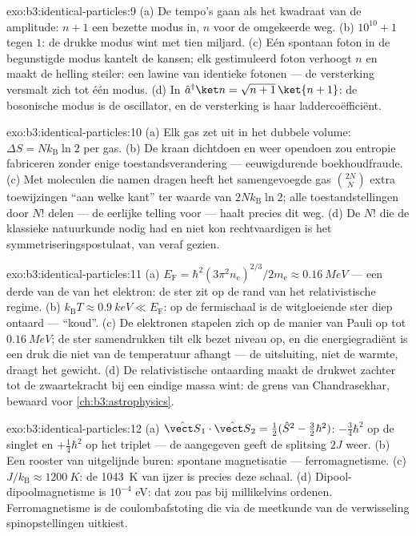 \begin{solution}{exo:b3:identical-particles:9}
(a) De tempo's gaan als het kwadraat van de amplitude: $n + 1$ een bezette
modus in, $n$ voor de omgekeerde weg. (b) $10^{10} + 1$ tegen $1$: de
drukke modus wint met tien miljard. (c) Eén spontaan foton in de
begunstigde modus kantelt de kansen; elk gestimuleerd foton verhoogt $n$
en maakt de helling steiler: een lawine van identieke fotonen --- de
versterking versmalt zich tot één modus. (d) In $\hat a^\dagger\ket n =
\sqrt{n+1}\,\ket{n+1}$: de bosonische modus is de oscillator, en de
versterking is haar laddercoëfficiënt.
\end{solution}

\begin{solution}{exo:b3:identical-particles:10}
(a) Elk gas zet uit in het dubbele volume: $\Delta S =
Nk_{\text{B}}\ln2$
per gas. (b) De kraan dichtdoen en weer opendoen zou entropie fabriceren
zonder enige toestandsverandering --- eeuwigdurende boekhoudfraude. (c)
Met moleculen die namen dragen heeft het samengevoegde gas
$\binom{2N}{N}$ extra toewijzingen ``aan welke kant'' ter waarde van
$2Nk_{\text{B}}\ln2$; alle toestandstellingen door $N!$ delen --- de
eerlijke telling voor  --- haalt precies dit weg. (d) De
$N!$ die de klassieke natuurkunde nodig had en niet kon rechtvaardigen is
het symmetriseringspostulaat, van veraf gezien.
\end{solution}

\begin{solution}{exo:b3:identical-particles:11}
(a) $E_{\text{F}} = \hbar^2(3\pi^2n_{\text{e}})^{2/3}/2m_{\text{e}}
\approx \qty{0.16}{MeV}$ --- een derde van de  van het
elektron: de ster zit op de rand van het relativistische regime. (b)
$k_{\text{B}}T \approx \qty{0.9}{keV} \ll E_{\text{F}}$: op de fermischaal
is de witgloeiende ster diep ontaard --- ``koud''. (c) De elektronen
stapelen zich op de manier van Pauli op tot $\qty{0.16}{MeV}$; de ster
samendrukken tilt elk bezet niveau op, en die energiegradiënt is een druk
die niet van de temperatuur afhangt --- de uitsluiting, niet de warmte,
draagt het gewicht. (d) De relativistische ontaarding maakt de drukwet
zachter tot de zwaartekracht bij een eindige massa wint: de grens van
Chandrasekhar, bewaard voor \cref{ch:b3:astrophysics}.
\end{solution}

\begin{solution}{exo:b3:identical-particles:12}
(a) $\hat{\vect S}_1\cdot\hat{\vect S}_2 = \tfrac12(\hat S^2 -
\tfrac32\hbar^2)$: $-\tfrac34\hbar^2$ op de singlet en
$+\tfrac14\hbar^2$ op het triplet --- de aangegeven  geeft de
splitsing $2J$ weer. (b) Een rooster van uitgelijnde buren: spontane
magnetisatie --- ferromagnetisme. (c) $J/k_{\text{B}}
\approx \qty{1200}{K}$: de \qty{1043}{K} van ijzer is precies deze schaal. (d)
Dipool-dipoolmagnetisme is $10^{-4}$ eV: dat zou pas bij millikelvins
ordenen. Ferromagnetisme is de coulombafstoting die via de meetkunde van
de verwisseling spinopstellingen uitkiest.
\end{solution}

